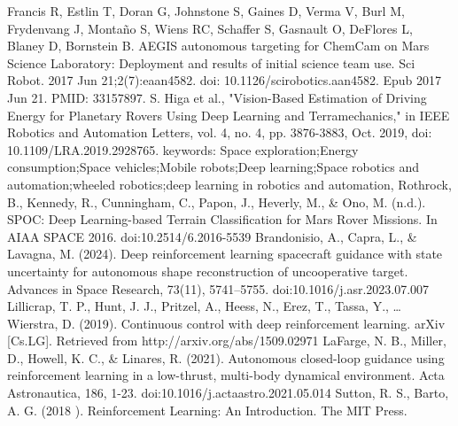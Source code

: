 \documentclass[conference]{IEEEtran}
\begin{document}
\begin{thebibliography}{00}
 Francis R, Estlin T, Doran G, Johnstone S, Gaines D, Verma V, Burl M, Frydenvang J, Montaño S, Wiens RC, Schaffer S, Gasnault O, DeFlores L, Blaney D, Bornstein B. AEGIS autonomous targeting for ChemCam on Mars Science Laboratory: Deployment and results of initial science team use. Sci Robot. 2017 Jun 21;2(7):eaan4582. doi: 10.1126/scirobotics.aan4582. Epub 2017 Jun 21. PMID: 33157897.
 S. Higa et al., "Vision-Based Estimation of Driving Energy for Planetary Rovers Using Deep Learning and Terramechanics," in IEEE Robotics and Automation Letters, vol. 4, no. 4, pp. 3876-3883, Oct. 2019, doi: 10.1109/LRA.2019.2928765.
keywords: {Space exploration;Energy consumption;Space vehicles;Mobile robots;Deep learning;Space robotics and automation;wheeled robotics;deep learning in robotics and automation},
 Rothrock, B., Kennedy, R., Cunningham, C., Papon, J., Heverly, M., \& Ono, M. (n.d.). SPOC: Deep Learning-based Terrain Classification for Mars Rover Missions. In AIAA SPACE 2016. doi:10.2514/6.2016-5539
 Brandonisio, A., Capra, L., \& Lavagna, M. (2024). Deep reinforcement learning spacecraft guidance with state uncertainty for autonomous shape reconstruction of uncooperative target. Advances in Space Research, 73(11), 5741–5755. doi:10.1016/j.asr.2023.07.007
 Lillicrap, T. P., Hunt, J. J., Pritzel, A., Heess, N., Erez, T., Tassa, Y., … Wierstra, D. (2019). Continuous control with deep reinforcement learning. arXiv [Cs.LG]. Retrieved from http://arxiv.org/abs/1509.02971
 LaFarge, N. B., Miller, D., Howell, K. C., \& Linares, R. (2021). Autonomous closed-loop guidance using reinforcement learning in a low-thrust, multi-body dynamical environment. Acta Astronautica, 186, 1-23. doi:10.1016/j.actaastro.2021.05.014
 Sutton, R. S., Barto, A. G. (2018 ). Reinforcement Learning: An Introduction. The MIT Press.
\end{thebibliography}
\end{document}
